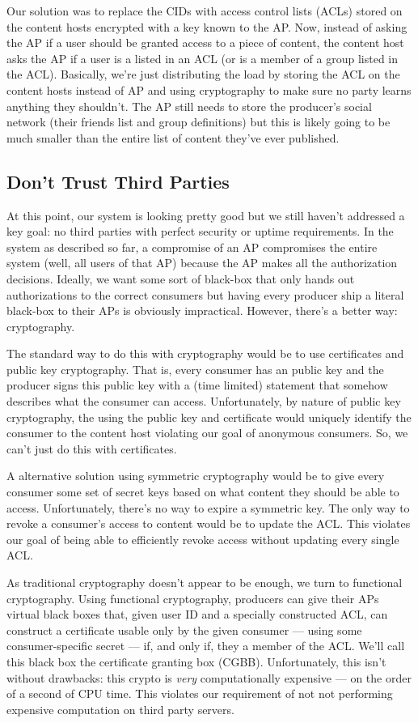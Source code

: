 \documentclass[pdftex,12pt,a4papaer,twoside,notitlepage]{report}
\begin{document}
Our solution was to replace the CIDs with access control lists (ACLs) stored on
the content hosts encrypted with a key known to the AP. Now, instead of asking
the AP if a user should be granted access to a piece of content, the content
host asks the AP if a user is a listed in an ACL (or is a member of a group
listed in the ACL). Basically, we're just distributing the load by storing the
ACL on the content hosts instead of AP and using cryptography to make sure no
party learns anything they shouldn't. The AP still needs to store the producer's
social network (their friends list and group definitions) but this is likely
going to be much smaller than the entire list of content they've ever published.

\subsection{Don't Trust Third Parties}

At this point, our system is looking pretty good but we still haven't addressed
a key goal: no third parties with perfect security or uptime requirements. In
the system as described so far, a compromise of an AP compromises the entire
system (well, all users of that AP) because the AP makes all the authorization
decisions. Ideally, we want some sort of black-box that only hands out
authorizations to the correct consumers but having every producer ship a
literal black-box to their APs is obviously impractical. However, there's a
better way: cryptography.

The standard way to do this with cryptography would be to use certificates and
public key cryptography. That is, every consumer has an public key and the
producer signs this public key with a (time limited) statement that somehow
describes what the consumer can access. Unfortunately, by nature of public key
cryptography, the using the public key and certificate would uniquely identify
the consumer to the content host violating our goal of anonymous consumers. So,
we can't just do this with certificates.

A alternative solution using symmetric cryptography would be to give every
consumer some set of secret keys based on what content they should be able to
access. Unfortunately, there's no way to expire a symmetric key. The only way to
revoke a consumer's access to content would be to update the ACL. This violates
our goal of being able to efficiently revoke access without updating every
single ACL.

As traditional cryptography doesn't appear to be enough, we turn to functional
cryptography. Using functional cryptography, producers can give their APs
virtual black boxes that, given user ID and a specially constructed ACL, can
construct a certificate usable only by the given consumer --- using some
consumer-specific secret --- if, and only if, they a member of the ACL. We'll
call this black box the certificate granting box (CGBB). Unfortunately, this
isn't without drawbacks: this crypto is \emph{very} computationally expensive
--- on the order of a second of CPU time. This violates our requirement of not
not performing expensive computation on third party servers.
\end{document}
